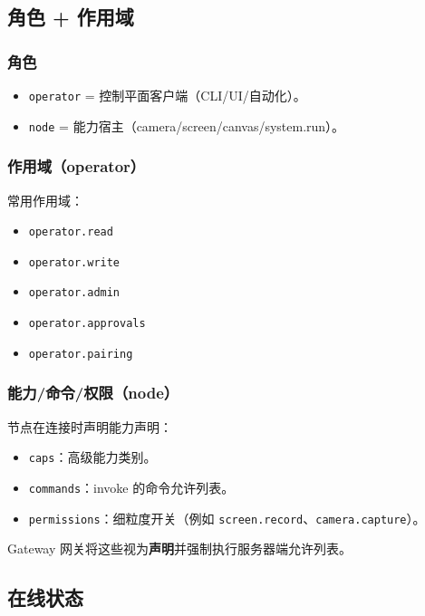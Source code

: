 \subsection{角色 + 作用域}


\subsubsection{角色}


\begin{itemize}
  \item \texttt{operator} = 控制平面客户端（CLI/UI/自动化）。
  \item \texttt{node} = 能力宿主（camera/screen/canvas/system.run）。
\end{itemize}


\subsubsection{作用域（operator）}


常用作用域：

\begin{itemize}
  \item \texttt{operator.read}
  \item \texttt{operator.write}
  \item \texttt{operator.admin}
  \item \texttt{operator.approvals}
  \item \texttt{operator.pairing}
\end{itemize}


\subsubsection{能力/命令/权限（node）}


节点在连接时声明能力声明：

\begin{itemize}
  \item \texttt{caps}：高级能力类别。
  \item \texttt{commands}：invoke 的命令允许列表。
  \item \texttt{permissions}：细粒度开关（例如 \texttt{screen.record}、\texttt{camera.capture}）。
\end{itemize}


Gateway 网关将这些视为\textbf{声明}并强制执行服务器端允许列表。

\subsection{在线状态}


